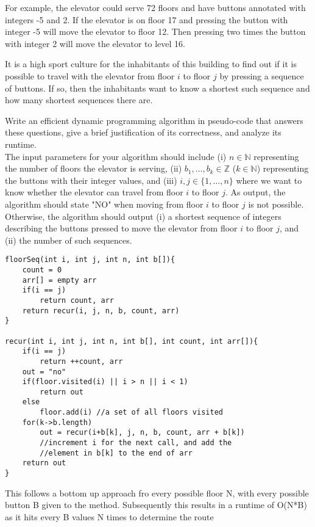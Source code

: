 \documentclass[11pt]{amsart}
\begin{document}
For example, the elevator could serve 72 floors and have buttons annotated with integers -5 and 2. If the elevator is on
floor 17 and pressing the button with integer -5 will move the elevator to floor 12. Then pressing two times the button with
integer 2 will move the elevator to level 16.\medskip

It is a high sport culture for the inhabitants of this building to find out if it is possible to travel with the elevator from floor
$i$ to floor $j$ by pressing a sequence of buttons. If so, then the inhabitants want to know a shortest such sequence
and how many shortest sequences there are.\medskip

Write an efficient dynamic programming algorithm in pseudo-code that answers these questions, give a brief justification
of its correctness, and analyze its runtime.\\

The input parameters for your algorithm should include (i) $n\in \mathbb{N}$ representing the number of floors the 
elevator is serving, (ii) $b_1,\ldots, b_k \in \mathbb{Z}$ ($k\in\mathbb{N}$) representing the buttons with their
integer values, and (iii) $i,j \in \{1,\ldots , n\}$ where we want to know whether the elevator can travel from floor $i$ to floor $j$.
As output, the algorithm should state "NO" when moving from floor $i$ to floor $j$ is not possible. Otherwise, the 
algorithm should output (i) a shortest sequence of integers describing the buttons pressed to move the elevator from floor
$i$ to floor $j$, and (ii) the number of such sequences.

\newpage
\begin{lstlisting}
floorSeq(int i, int j, int n, int b[]){
    count = 0
    arr[] = empty arr
    if(i == j) 
        return count, arr
    return recur(i, j, n, b, count, arr)
}

recur(int i, int j, int n, int b[], int count, int arr[]){
    if(i == j) 
        return ++count, arr
    out = "no"
    if(floor.visited(i) || i > n || i < 1) 
        return out
    else 
        floor.add(i) //a set of all floors visited
    for(k->b.length)
        out = recur(i+b[k], j, n, b, count, arr + b[k]) 
        //increment i for the next call, and add the 
        //element in b[k] to the end of arr
    return out    
}
\end{lstlisting}
This follows a bottom up approach fro every possible floor N, with every possible button B given to the method. Subsequently this results in a runtime of O(N*B) as it hits every B values N times to determine the route
\newpage
\end{document}
